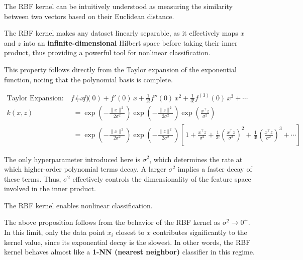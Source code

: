 \documentclass[../main]{subfiles}
\begin{document}
        \begin{remark}
            The RBF kernel can be intuitively understood as measuring the similarity between two vectors based on their Euclidean distance.
        \end{remark}
        
        The RBF kernel makes any dataset linearly separable, as it effectively maps $x$ and $z$ into an \textbf{infinite-dimensional} Hilbert space before taking their inner product, thus providing a powerful tool for nonlinear classification.
        
        This property follows directly from the Taylor expansion of the exponential function, noting that the polynomial basis is complete.

\begin{remark}
    \begin{align}
        \text{Taylor Expansion:} \quad 
        f(x) &= f(0) + f'(0)\,x + \frac{1}{2!} f''(0)\,x^2 
              + \frac{1}{3!} f^{(3)}(0)\,x^3 + \cdots \\[6pt]
        k(x,z) &= \exp\left(-\frac{\|x\|^2}{2\sigma^2}\right)
                  \exp\left(-\frac{\|z\|^2}{2\sigma^2}\right)
                  \exp\left(\frac{x^\top z}{\sigma^2}\right) \\[6pt]
        &= \exp\left(-\frac{\|x\|^2}{2\sigma^2}\right)
            \exp\left(-\frac{\|z\|^2}{2\sigma^2}\right)
            \left[\,1
            + \frac{x^\top z}{\sigma^2}
            + \frac{1}{2!}\!\left(\frac{x^\top z}{\sigma^2}\right)^2
            + \frac{1}{3!}\!\left(\frac{x^\top z}{\sigma^2}\right)^3
            + \cdots \right]
        \end{align}
\end{remark}
The only hyperparameter introduced here is $\sigma^2$, which determines the rate at which higher-order polynomial terms decay.  
A larger $\sigma^2$ implies a faster decay of these terms.  
Thus, $\sigma^2$ effectively controls the dimensionality of the feature space involved in the inner product.

\begin{proposition}
    The RBF kernel enables nonlinear classification.
\end{proposition}

The above proposition follows from the behavior of the RBF kernel as $\sigma^2 \to 0^+$.  
In this limit, only the data point $x_i$ closest to $x$ contributes significantly to the kernel value, since its exponential decay is the slowest.  
In other words, the RBF kernel behaves almost like a \textbf{1-NN (nearest neighbor)} classifier in this regime.
\end{document}
